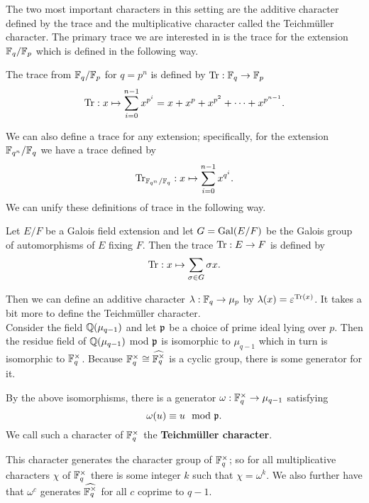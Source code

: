 The two most important characters in this setting are the additive character defined by the trace and the multiplicative character called the Teichm\"uller character. 
The primary trace we are interested in is the trace for the extension $\mathbb{F}_q / \mathbb{F}_p$ which is defined in the following way.
\begin{defn}
The trace from $\mathbb{F}_q / \mathbb{F}_p$ for $q = p^n$ is defined by $\textrm{Tr} : \mathbb{F}_q \to \mathbb{F}_p$
 \[ \textrm{Tr} : x \mapsto \sum_{i=0}^{n-1} x^{p^i} = x + x^p + x^{p^2} + \cdots + x^{p^{n-1}}.\]
\end{defn}
We can also define a trace for any extension; specifically, for the extension $\mathbb{F}_{q^n}/\mathbb{F}_q$ we have a trace defined by \[\textrm{Tr}_{\mathbb{F}_{q^n}/\mathbb{F}_q} : x \mapsto \sum_{i=0}^{n-1} x^{q^i}.\] 
We can unify these definitions of trace in the following way.
\begin{defn}
Let $E/F$ be a Galois field extension and let $G = \textrm{Gal}(E/F)$ be the Galois group of automorphisms of $E$ fixing $F$. 
Then the trace $\textrm{Tr} : E \to F$ is defined by \[\textrm{Tr} : x \mapsto \sum_{\sigma \in G} \sigma x.\]
\end{defn}

\noindent Then we can define an additive character $\lambda : \mathbb{F}_q \to \mu_p$ by $\lambda(x) = \varepsilon^{\textrm{Tr}(x)}$.
It takes a bit more to define the Teichm\"uller character.\\

Consider the field $\mathbb{Q}(\mu_{q-1})$ and let $\mathfrak{p}$ be a choice of prime ideal lying over $p$.
Then the residue field of $\mathbb{Q}(\mu_{q-1})$ mod $\mathfrak{p}$ is isomorphic to $\mu_{q-1}$ which in turn is isomorphic to $\mathbb{F}_q^\times$.
Because $\mathbb{F}_q^\times \cong \widehat{\mathbb{F}_q^\times}$ is a cyclic group, there is some generator for it.
\begin{prop}\label{def:Teichmuller-char}
  By the above isomorphisms, there is a generator $\omega : \mathbb{F}_q^\times \to \mu_{q-1}$ satisfying \[\omega (u) \equiv  u \mod {\mathfrak{p}}.\]
  We call such a character of $\mathbb{F}_q^\times$ the \textbf{Teichm\"uller character}.
\end{prop}
\noindent This character generates the character group of $\mathbb{F}_q^\times$; so for all multiplicative characters $\chi$ of $\mathbb{F}_q^\times$ there is some integer $k$ such that $\chi = \omega^k$.
We also further have that $\omega^c$ generates $\widehat{\mathbb{F}_q^\times}$ for all $c$ coprime to $q-1$.\\

